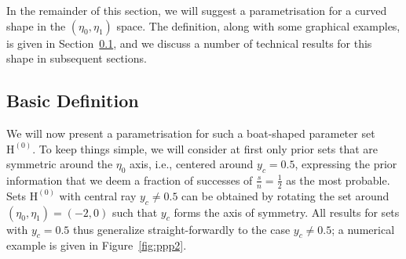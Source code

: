 \documentclass[runningheads,a4paper]{llncs}
\newcommand{\uz}{^{(0)}} %
\def\EZ{\mathrm{H}\uz}
\begin{document}
In the remainder of this section, 
we will suggest a parametrisation for a curved shape in the $(\eta_0, \eta_1)$ space.
The definition, along with some graphical examples, is given in Section~\ref{sec:basicdefboat},
and we discuss a number of technical results for this shape in subsequent sections.


\subsection{Basic Definition}
\label{sec:basicdefboat}

We will now present a parametrisation for such a boat-shaped parameter set $\EZ$.
To keep things simple, we will consider at first only prior sets
that are symmetric around the $\eta_0$ axis, i.e., centered around $y_c = 0.5$,
expressing the prior information that we deem a fraction of successes of $\frac{s}{n} = \frac{1}{2}$ as the most probable.
Sets $\EZ$ with central ray $y_c \neq 0.5$ can be obtained
by rotating the set around $(\eta_0, \eta_1) = (-2,0)$ such that $y_c$ forms the axis of symmetry.
All results for sets with $y_c = 0.5$ thus generalize straight-forwardly to the case $y_c \neq 0.5$;
a numerical example is given in Figure~\ref{fig:ppp2}.
\end{document}

